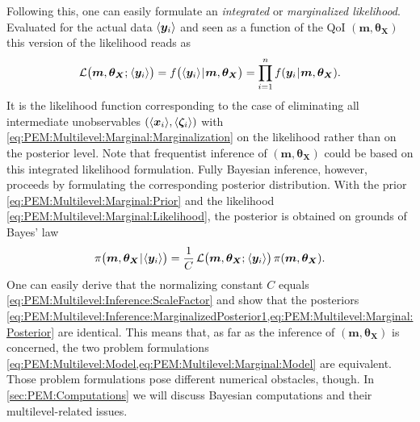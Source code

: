 Following this, one can easily formulate an \textit{integrated} or \textit{marginalized likelihood}.
Evaluated for the actual data \(\langle{\bm{y}_i}\rangle\) and seen as a function of the QoI \((\bm{m},\bm{\theta}_{\bm{X}})\) this version of the likelihood reads as
\begin{equation} \label{eq:PEM:Multilevel:Marginal:Likelihood}
  \mathcal{L} \big( \bm{m},\bm{\theta}_{\bm{X}} ;{\:\!} \langle{\bm{y}_i}\rangle \big)
  = f \big( \langle{\bm{y}_i}\rangle {\:\!}|{\:\!} \bm{m},\bm{\theta}_{\bm{X}} \big) = \prod_{i=1}^n f(\bm{y}_i {\:\!}|{\:\!} \bm{m},\bm{\theta}_{\bm{X}}).
\end{equation}
It is the likelihood function corresponding to the case of eliminating all intermediate unobservables \((\langle{\bm{x}_i}\rangle,\langle{\bm{\zeta}_i}\rangle)\)
with \cref{eq:PEM:Multilevel:Marginal:Marginalization} on the likelihood rather than on the posterior level.
Note that frequentist inference of \((\bm{m},\bm{\theta}_{\bm{X}})\) could be based on this integrated likelihood formulation.
Fully Bayesian inference, however, proceeds by formulating the corresponding posterior distribution.
With the prior \cref{eq:PEM:Multilevel:Marginal:Prior} and the likelihood \cref{eq:PEM:Multilevel:Marginal:Likelihood}, the posterior is obtained on grounds of Bayes' law
\begin{equation} \label{eq:PEM:Multilevel:Marginal:Posterior}
  \pi \big( \bm{m},\bm{\theta}_{\bm{X}} {\:\!}|{\:\!} \langle{\bm{y}_i}\rangle \big)
  = \frac{1}{C} \, \mathcal{L} \big( \bm{m},\bm{\theta}_{\bm{X}} ;{\:\!} \langle{\bm{y}_i}\rangle \big) \, \pi(\bm{m},\bm{\theta}_{\bm{X}}).
\end{equation}
One can easily derive that the normalizing constant \(C\) equals \cref{eq:PEM:Multilevel:Inference:ScaleFactor}
and show that the posteriors \cref{eq:PEM:Multilevel:Inference:MarginalizedPosterior1,eq:PEM:Multilevel:Marginal:Posterior} are identical.
This means that, as far as the inference of \((\bm{m},\bm{\theta}_{\bm{X}})\) is concerned, the two problem formulations \cref{eq:PEM:Multilevel:Model,eq:PEM:Multilevel:Marginal:Model} are equivalent.
Those problem formulations pose different numerical obstacles, though.
In \cref{sec:PEM:Computations} we will discuss Bayesian computations and their multilevel-related issues.

